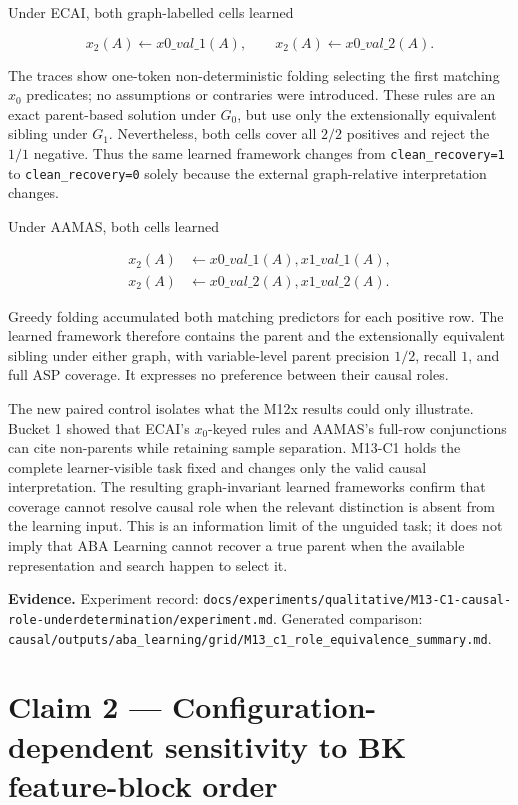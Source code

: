 \documentclass[11pt]{article}
\begin{document}
Under ECAI, both graph-labelled cells learned

\[ x_2(A)\leftarrow x0\_val\_1(A), \qquad x_2(A)\leftarrow x0\_val\_2(A). \]

The traces show one-token non-deterministic folding selecting the first matching \(x_0\) predicates; no assumptions or contraries were introduced. These rules are an exact parent-based solution under \(G_0\), but use only the extensionally equivalent sibling under \(G_1\). Nevertheless, both cells cover all \(2/2\) positives and reject the \(1/1\) negative. Thus the same learned framework changes from \texttt{clean\_recovery=1} to \texttt{clean\_recovery=0} solely because the external graph-relative interpretation changes.

Under AAMAS, both cells learned

\[ \begin{aligned} x_2(A)&\leftarrow x0\_val\_1(A),x1\_val\_1(A),\\ x_2(A)&\leftarrow x0\_val\_2(A),x1\_val\_2(A). \end{aligned} \]

Greedy folding accumulated both matching predictors for each positive row. The learned framework therefore contains the parent and the extensionally equivalent sibling under either graph, with variable-level parent precision \(1/2\), recall \(1\), and full ASP coverage. It expresses no preference between their causal roles.

The new paired control isolates what the M12x results could only illustrate. Bucket 1 showed that ECAI's \(x_0\)-keyed rules and AAMAS's full-row conjunctions can cite non-parents while retaining sample separation. M13-C1 holds the complete learner-visible task fixed and changes only the valid causal interpretation. The resulting graph-invariant learned frameworks confirm that coverage cannot resolve causal role when the relevant distinction is absent from the learning input. This is an information limit of the unguided task; it does not imply that ABA Learning cannot recover a true parent when the available representation and search happen to select it.

\textbf{Evidence.} Experiment record: \texttt{docs/experiments/qualitative/M13-C1-causal-role-underdetermination/experiment.md}. Generated comparison: \texttt{causal/outputs/aba\_learning/grid/M13\_c1\_role\_equivalence\_summary.md}.

\section{Claim 2 --- Configuration-dependent sensitivity to BK feature-block order}
\end{document}
